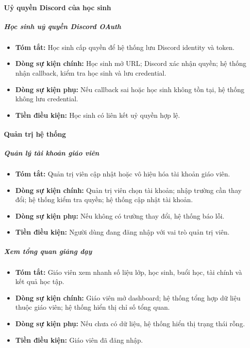\documentclass[12pt,a4paper]{article}
\begin{document}
\paragraph{Uỷ quyền Discord của học sinh}

\subparagraph{Học sinh uỷ quyền Discord OAuth}
\begin{itemize}[leftmargin=*]
\item \textbf{Tóm tắt:} Học sinh cấp quyền để hệ thống lưu Discord identity và token.
\item \textbf{Dòng sự kiện chính:} Học sinh mở URL; Discord xác nhận quyền; hệ thống nhận callback, kiểm tra học sinh và lưu credential.
\item \textbf{Dòng sự kiện phụ:} Nếu callback sai hoặc học sinh không tồn tại, hệ thống không lưu credential.
\item \textbf{Tiền điều kiện:} Học sinh có liên kết uỷ quyền hợp lệ.
\end{itemize}

\paragraph{Quản trị hệ thống}

\subparagraph{Quản lý tài khoản giáo viên}
\begin{itemize}[leftmargin=*]
\item \textbf{Tóm tắt:} Quản trị viên cập nhật hoặc vô hiệu hóa tài khoản giáo viên.
\item \textbf{Dòng sự kiện chính:} Quản trị viên chọn tài khoản; nhập trường cần thay đổi; hệ thống kiểm tra quyền; hệ thống cập nhật tài khoản.
\item \textbf{Dòng sự kiện phụ:} Nếu không có trường thay đổi, hệ thống báo lỗi.
\item \textbf{Tiền điều kiện:} Người dùng đang đăng nhập với vai trò quản trị viên.
\end{itemize}

\subparagraph{Xem tổng quan giảng dạy}
\begin{itemize}[leftmargin=*]
\item \textbf{Tóm tắt:} Giáo viên xem nhanh số liệu lớp, học sinh, buổi học, tài chính và kết quả học tập.
\item \textbf{Dòng sự kiện chính:} Giáo viên mở dashboard; hệ thống tổng hợp dữ liệu thuộc giáo viên; hệ thống hiển thị chỉ số tổng quan.
\item \textbf{Dòng sự kiện phụ:} Nếu chưa có dữ liệu, hệ thống hiển thị trạng thái rỗng.
\item \textbf{Tiền điều kiện:} Giáo viên đã đăng nhập.
\end{itemize}
\end{document}
